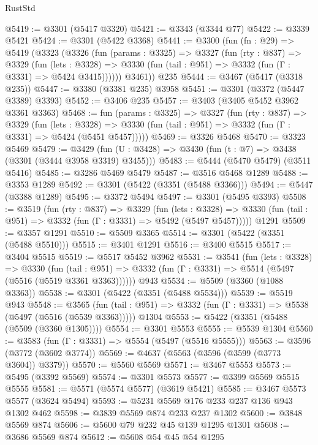 \begin{lexlean}{RustStd}
\begin{coremodule}
@5419 := @3301 (@5417 @3320)
@5421 := @3343 (@3344 @77)
@5422 := @3339 @5421
@5424 := @3301 (@5422 @3368)
@5441 := @3300
    (fun (fn : @29) =>
    @5419
      (@3323
        (@3326
          (fun (params : @3325) =>
          @3327
            (fun (rty : @837) =>
            @3329
              (fun (lets : @3328) =>
              @3330 (fun (tail : @951) => @3332 (fun (Γ : @3331) => @5424 @3415))))))
        @3461))
    @235
@5444 := @3467 (@5417 (@3318 @235))
@5447 := @3380 (@3381 @235) @3958
@5451 := @3301 (@3372 (@5447 @3389) @3393)
@5452 := @3406 @235
@5457 := @3403 (@3405 @5452 @3962 @3361 @3363)
@5468 := fun (params : @3325) =>
  @3327
    (fun (rty : @837) =>
    @3329
      (fun (lets : @3328) =>
      @3330 (fun (tail : @951) => @3332 (fun (Γ : @3331) => @5424 (@5451 @5457)))))
@5469 := @3326 @5468
@5470 := @3323 @5469
@5479 := @3429 (fun (U : @3428) => @3430 (fun (t : @7) => @3438 (@3301 (@3444 @3958 @3319) @3455)))
@5483 := @5444 (@5470 @5479) (@3511 @5416)
@5485 := @3286 @5469 @5479
@5487 := @3516 @5468 @1289
@5488 := @3353 @1289
@5492 := @3301 (@5422 (@3351 (@5488 @3366)))
@5494 := @5447 (@3388 @1289)
@5495 := @3372 @5494
@5497 := @3301 (@5495 @3393)
@5508 := @3519
    (fun (rty : @837) =>
    @3329
      (fun (lets : @3328) =>
      @3330 (fun (tail : @951) => @3332 (fun (Γ : @3331) => @5492 (@5497 @5457)))))
    @1291
@5509 := @3357 @1291
@5510 := @5509 @3365
@5514 := @3301 (@5422 (@3351 (@5488 @5510)))
@5515 := @3401 @1291
@5516 := @3400 @5515
@5517 := @3404 @5515
@5519 := @5517 @5452 @3962
@5531 := @3541
    (fun (lets : @3328) =>
    @3330
      (fun (tail : @951) => @3332 (fun (Γ : @3331) => @5514 (@5497 (@5516 (@5519 @3361 @3363))))))
    @943
@5534 := @5509 (@3360 (@1088 @3363))
@5538 := @3301 (@5422 (@3351 (@5488 @5534)))
@5539 := @5519 @943
@5548 := @3565
    (fun (tail : @951) => @3332 (fun (Γ : @3331) => @5538 (@5497 (@5516 (@5539 @3363)))))
    @1304
@5553 := @5422 (@3351 (@5488 (@5509 (@3360 @1305))))
@5554 := @3301 @5553
@5555 := @5539 @1304
@5560 := @3583 (fun (Γ : @3331) => @5554 (@5497 (@5516 @5555)))
@5563 := @3596 (@3772 (@3602 @3774))
@5569 := @4637 (@5563 (@3596 (@3599 (@3773 @3604)) @3379))
@5570 := @5560 @5569
@5571 := @3467 @5553
@5573 := @5495 (@3392 @5569)
@5574 := @3301 @5573
@5577 := @3399 @5569 @5515 @5555
@5581 := @5571 (@5574 @5577) (@3619 @5421)
@5585 := @3467 @5573 @5577 (@3624 @5494)
@5593 := @5231 @5569 @176 @233 @237 @136 @943 @1302 @462
@5598 := @3839 @5569 @874 @233 @237 @1302
@5600 := @3848 @5569 @874
@5606 := @5600 @79 @232 @45 @139 @1295 @1301
@5608 := @3686 @5569 @874
@5612 := @5608 @54 @45 @54 @1295

\end{coremodule}
\end{lexlean}
